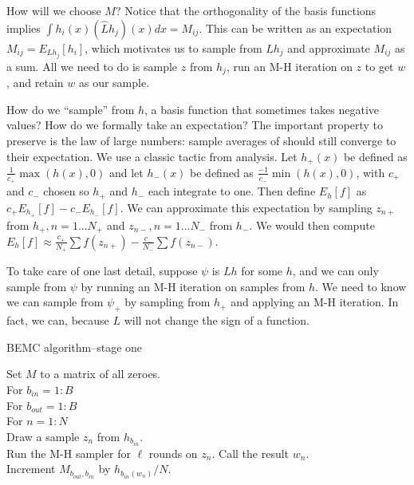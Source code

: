 \documentclass{article}
\begin{document}
How will we choose $M$? Notice that the orthogonality of the basis functions implies $\int h_i(x)(\hat{L}h_j)(x)dx =  M_{ij}$. This can be written as an expectation $M_{ij} = E_{Lh_j}[h_i]$, which motivates us to sample from $Lh_j$ and approximate $M_{ij}$ as a sum. All we need to do is sample $z$ from $h_j$, run an M-H iteration on $z$ to get $w$, and retain $w$ as our sample. 

How do we ``sample'' from $h$, a basis function that sometimes takes negative values? How do we formally take an expectation? The important property to preserve is the law of large numbers: sample averages of should still converge to their expectation. We use a classic tactic from analysis. Let $h_+(x)$ be defined as $\frac{1}{c_+}\max(h(x), 0)$ and let $h_-(x)$ be defined as $\frac{-1}{c_-}\min(h(x), 0)$, with $c_+$ and $c_-$ chosen so $h_+$ and $h_-$ each integrate to one. Then define $E_{h}[f]$ as $c_+E_{h_+}[f]-c_-E_{h_-}[f]$. We can approximate this expectation by sampling $z_{n+}$ from $h_+, n=1...N_+$ and $z_{n-}, n=1...N_-$ from $h_-$. We would then compute $E_{h}[f] \approx \frac{c_+}{N_+}\sum f(z_{n+})-\frac{c_-}{N_-}\sum f(z_{n-})$. %

To take care of one last detail, suppose $\psi$ is $Lh$ for some $h$, and we can only sample from $\psi$ by running an M-H iteration on samples from $h$. We need to know we can sample from $\psi_+$ by sampling from $h_+$ and applying an M-H iteration. In fact, we can, because $L$ will not change the sign of a function. 

\begin{algorithm}[h]
\caption{BEMC algorithm--stage one}
Set $M$ to a matrix of all zeroes.\\
For $b_{in}  = 1:B$\\
\Indp
For $b_{out}  = 1:B$\\
\Indp
For $n = 1:N$\\
\Indp
Draw a sample $z_n$ from $h_{b_{in}}$.\\
Run the M-H sampler for $\ell$ rounds on $z_n$. Call the result $w_n$.\\
Increment $M_{b_{out}, b_{in}}$ by $h_{b_{in}(w_n)}/N$.\\
\Indm
\Indm
\Indm

\end{algorithm}
\end{document}
